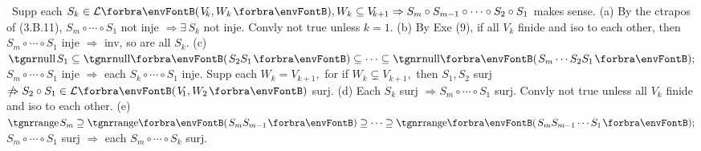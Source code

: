 \BulletPointX{} \,\,\,Supp each $S_k\in\Lm{V_{\!k},W_k},W_k\subseteq V_{\!k+1}\Rightarrow S_m\circ S_{m-1}\circ\cdots\circ S_2\circ S_1$ makes sense.\TextB{}
(a) By the ctrapos of (3.B.11), $S_m\circ\cdots\circ S_1$ not inje $\Rightarrow\exists\,S_k$ not inje. Convly not true unless $k=1.$\TextB{}
(b) By Exe (9), if all $V_{\!k}$ finide and iso to each other, then $S_m\circ\cdots\circ S_1$ inje $\Rightarrow$ inv, so are all $S_k.$\TextB{}
(c) $\null S_1\subseteq \Null\Par{S_2S_1}\subseteq\cdots\subseteq\Null\Par{S_m\cdots S_2S_1};$ \;$S_m\circ\cdots\circ S_1$ inje $\Rightarrow$ each $S_k\circ\cdots\circ S_1$ inje.\vspace{2pt}\TextB{}
Supp each $W_k=V_{\!k+1},$ for if $W_k\subsetneq V_{\!k+1},$ then $S_1,S_2$ surj $\notRightarrow S_2\circ S_1\in\Lm{V_{\!1},W_2}$ surj.\TextB{}
(d) Each $S_k$ surj $\Rightarrow S_m\circ\cdots\circ S_1$ surj. Convly not true unless all $V_{\!k}$ finide and iso to each other.\TextB{}
(e) $\range S_m\supseteq\Range\Par{S_mS_{m-1}}\supseteq\cdots\supseteq\Range\Par{S_mS_{m-1}\cdots S_1};$ \;$S_m\circ\cdots\circ S_1$ surj $\Rightarrow$ each $S_m\circ\cdots\circ S_k$ surj.
\SepLine


